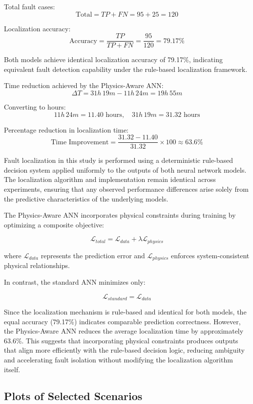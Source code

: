 \documentclass[final,5p,times,twocolumn,authoryear]{elsarticle}
\begin{document}
\bigskip

Total fault cases:
\[
\text{Total} = TP + FN = 95 + 25 = 120
\]

Localization accuracy:
\[
\text{Accuracy} = \frac{TP}{TP + FN} = \frac{95}{120} = 79.17\%
\]

Both models achieve identical localization accuracy of 79.17\%, indicating equivalent fault detection capability under the rule-based localization framework.

\bigskip

Time reduction achieved by the Physics-Aware ANN:
\[
\Delta T = 31h\,19m - 11h\,24m = 19h\,55m
\]

Converting to hours:
\[
11h\,24m = 11.40 \text{ hours}, \quad
31h\,19m = 31.32 \text{ hours}
\]

Percentage reduction in localization time:
\[
\text{Time Improvement} =
\frac{31.32 - 11.40}{31.32} \times 100
\approx 63.6\%
\]

\bigskip

Fault localization in this study is performed using a deterministic rule-based decision system applied uniformly to the outputs of both neural network models. The localization algorithm and implementation remain identical across experiments, ensuring that any observed performance differences arise solely from the predictive characteristics of the underlying models.

The Physics-Aware ANN incorporates physical constraints during training by optimizing a composite objective:

\[
\mathcal{L}_{total} = \mathcal{L}_{data} + \lambda \mathcal{L}_{physics}
\]

where $\mathcal{L}_{data}$ represents the prediction error and $\mathcal{L}_{physics}$ enforces system-consistent physical relationships.

In contrast, the standard ANN minimizes only:

\[
\mathcal{L}_{standard} = \mathcal{L}_{data}
\]

Since the localization mechanism is rule-based and identical for both models, the equal accuracy (79.17\%) indicates comparable prediction correctness. However, the Physics-Aware ANN reduces the average localization time by approximately 63.6\%. This suggests that incorporating physical constraints produces outputs that align more efficiently with the rule-based decision logic, reducing ambiguity and accelerating fault isolation without modifying the localization algorithm itself.

\subsection{Plots of Selected Scenarios}
\end{document}
